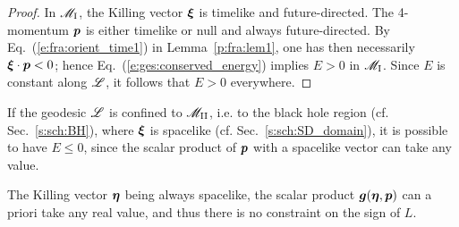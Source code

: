 \begin{proof}
In $\mathscr{M}_{\rm I}$, the Killing vector $\bm{\xi}$ is timelike and future-directed.
The 4-momentum $\bm{p}$ is either timelike or null and always future-directed.
By Eq.~(\ref{e:fra:orient_time1}) in Lemma~\ref{p:fra:lem1}, one has then necessarily $\bm{\xi}\cdot\bm{p} < 0$; hence Eq.~(\ref{e:ges:conserved_energy})
implies $E > 0$ in $\mathscr{M}_{\rm I}$. Since $E$ is constant along $\mathscr{L}$, it
follows that $E > 0$ everywhere.
\end{proof}
\begin{remark}
If the geodesic $\mathscr{L}$ is confined to $\mathscr{M}_{\rm II}$, i.e. to the black hole
region (cf. Sec.~\ref{s:sch:BH}),
where $\bm{\xi}$ is spacelike (cf. Sec.~\ref{s:sch:SD_domain}),
it is possible to have $E \leq 0$, since the
scalar product of $\bm{p}$ with a spacelike vector can take any value.
\end{remark}
\begin{remark}\label{r:ges:L_any_sign}
The Killing vector $\bm{\eta}$ being always spacelike,
the scalar product $\bm{g}(\bm{\eta},\bm{p})$ can a priori take any real value, and
thus there is no constraint
on the sign of $L$.
\end{remark}

